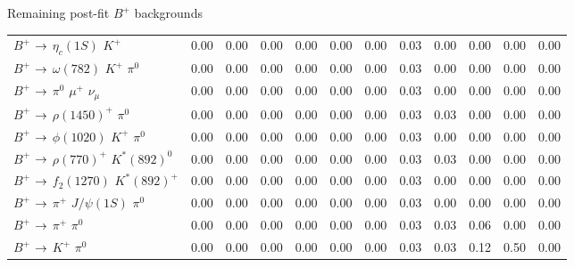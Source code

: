 \documentclass[xcolor=dvipsnames]{beamer}
\begin{document}
\begin{frame}{Remaining post-fit $B^+$ backgrounds}
{\begin{tabular}{lrrrrrrrrrrr}
      $B^{+}$ $\rightarrow$ $\eta_{c}(1S)$ $K^{+}$                                 &         0.00 &         0.00 &         0.00 &         0.00 &         0.00 &         0.00 &         0.03 &         0.00 &         0.00 &         0.00 &         0.00 \\
      $B^{+}$ $\rightarrow$ $\omega(782)$ $K^{+}$ $\pi^{0}$                        &         0.00 &         0.00 &         0.00 &         0.00 &         0.00 &         0.00 &         0.03 &         0.00 &         0.00 &         0.00 &         0.00 \\
      $B^{+}$ $\rightarrow$ $\pi^{0}$ $\mu^{+}$ $\nu_{\mu}$                        &         0.00 &         0.00 &         0.00 &         0.00 &         0.00 &         0.00 &         0.03 &         0.00 &         0.00 &         0.00 &         0.00 \\
      $B^{+}$ $\rightarrow$ $\rho(1450)^{+}$ $\pi^{0}$                             &         0.00 &         0.00 &         0.00 &         0.00 &         0.00 &         0.00 &         0.03 &         0.03 &         0.00 &         0.00 &         0.00 \\
      $B^{+}$ $\rightarrow$ $\phi(1020)$ $K^{+}$ $\pi^{0}$                         &         0.00 &         0.00 &         0.00 &         0.00 &         0.00 &         0.00 &         0.03 &         0.00 &         0.00 &         0.00 &         0.00 \\
      $B^{+}$ $\rightarrow$ $\rho(770)^{+}$ $K^{*}(892)^{0}$                       &         0.00 &         0.00 &         0.00 &         0.00 &         0.00 &         0.00 &         0.03 &         0.03 &         0.00 &         0.00 &         0.00 \\
      $B^{+}$ $\rightarrow$ $f_{2}(1270)$ $K^{*}(892)^{+}$                         &         0.00 &         0.00 &         0.00 &         0.00 &         0.00 &         0.00 &         0.03 &         0.00 &         0.00 &         0.00 &         0.00 \\
      $B^{+}$ $\rightarrow$ $\pi^{+}$ $J/\psi(1S)$ $\pi^{0}$                       &         0.00 &         0.00 &         0.00 &         0.00 &         0.00 &         0.00 &         0.03 &         0.00 &         0.00 &         0.00 &         0.00 \\
      $B^{+}$ $\rightarrow$ $\pi^{+}$ $\pi^{0}$                                    &         0.00 &         0.00 &         0.00 &         0.00 &         0.00 &         0.00 &         0.03 &         0.03 &         0.06 &         0.00 &         0.00 \\
      $B^{+}$ $\rightarrow$ $K^{+}$ $\pi^{0}$                                      &         0.00 &         0.00 &         0.00 &         0.00 &         0.00 &         0.00 &         0.03 &         0.03 &         0.12 &         0.50 &         0.00 \\

\end{tabular}}
\end{frame}
\end{document}
